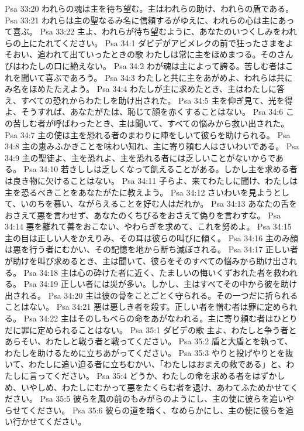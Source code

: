 Psa 33:20  われらの魂は主を待ち望む。主はわれらの助け、われらの盾である。
Psa 33:21  われらは主の聖なるみ名に信頼するがゆえに、われらの心は主にあって喜ぶ。
Psa 33:22  主よ、われらが待ち望むように、あなたのいつくしみをわれらの上にたれてください。
Psa 34:1  ダビデがアビメレクの前で狂ったさまをよそおい、追われて出ていったときの歌 わたしは常に主をほめまつる。そのさんびはわたしの口に絶えない。
Psa 34:2  わが魂は主によって誇る。苦しむ者はこれを聞いて喜ぶであろう。
Psa 34:3  わたしと共に主をあがめよ、われらは共にみ名をほめたたえよう。
Psa 34:4  わたしが主に求めたとき、主はわたしに答え、すべての恐れからわたしを助け出された。
Psa 34:5  主を仰ぎ見て、光を得よ、そうすれば、あなたがたは、恥じて顔を赤くすることはない。
Psa 34:6  この苦しむ者が呼ばわったとき、主は聞いて、すべての悩みから救い出された。
Psa 34:7  主の使は主を恐れる者のまわりに陣をしいて彼らを助けられる。
Psa 34:8  主の恵みふかきことを味わい知れ、主に寄り頼む人はさいわいである。
Psa 34:9  主の聖徒よ、主を恐れよ、主を恐れる者には乏しいことがないからである。
Psa 34:10  若きししは乏しくなって飢えることがある。しかし主を求める者は良き物に欠けることはない。
Psa 34:11  子らよ、来てわたしに聞け、わたしは主を恐るべきことをあなたがたに教えよう。
Psa 34:12  さいわいを見ようとして、いのちを慕い、ながらえることを好む人はだれか。
Psa 34:13  あなたの舌をおさえて悪を言わせず、あなたのくちびるをおさえて偽りを言わすな。
Psa 34:14  悪を離れて善をおこない、やわらぎを求めて、これを努めよ。
Psa 34:15  主の目は正しい人をかえりみ、その耳は彼らの叫びに傾く。
Psa 34:16  主のみ顔は悪を行う者にむかい、その記憶を地から断ち滅ぼされる。
Psa 34:17  正しい者が助けを叫び求めるとき、主は聞いて、彼らをそのすべての悩みから助け出される。
Psa 34:18  主は心の砕けた者に近く、たましいの悔いくずおれた者を救われる。
Psa 34:19  正しい者には災が多い。しかし、主はすべてその中から彼を助け出される。
Psa 34:20  主は彼の骨をことごとく守られる。その一つだに折られることはない。
Psa 34:21  悪は悪しき者を殺す。正しい者を憎む者は罪に定められる。
Psa 34:22  主はそのしもべらの命をあがなわれる。主に寄り頼む者はひとりだに罪に定められることはない。
Psa 35:1  ダビデの歌 主よ、わたしと争う者とあらそい、わたしと戦う者と戦ってください。
Psa 35:2  盾と大盾とを執って、わたしを助けるために立ちあがってください。
Psa 35:3  やりと投げやりとを抜いて、わたしに追い迫る者に立ちむかい、「わたしはおまえの救である」と、わたしに言ってください。
Psa 35:4  どうか、わたしの命を求める者をはずかしめ、いやしめ、わたしにむかって悪をたくらむ者を退け、あわてふためかせてください。
Psa 35:5  彼らを風の前のもみがらのようにし、主の使に彼らを追いやらせてください。
Psa 35:6  彼らの道を暗く、なめらかにし、主の使に彼らを追い行かせてください。
